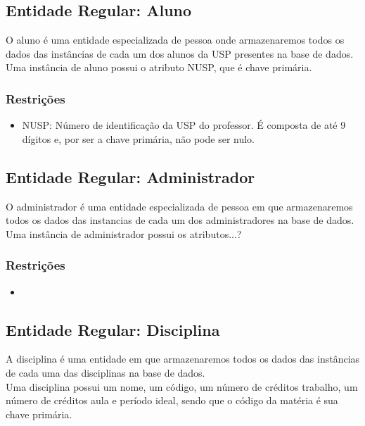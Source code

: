 \documentclass{article}
\begin{document}
  	\subsection{Entidade Regular: Aluno}
  	    \quad O aluno é uma entidade especializada de pessoa onde armazenaremos todos os dados das instâncias de cada um dos alunos da USP presentes na base de dados. \\
  	    \quad Uma instância de aluno possui o atributo NUSP, que é chave primária.
  	    \subsubsection{Restrições}
  	        \begin{itemize}
  		        \item NUSP: Número de identificação da USP do professor. É composta de até 9 dígitos e, por ser a chave primária, não pode ser nulo. 
  		    \end{itemize}
  		    
  	\subsection{Entidade Regular: Administrador}
  	    \quad O administrador é uma entidade especializada de pessoa em que armazenaremos todos os dados  das instancias de cada um dos administradores na base de dados. \\
  	    \quad Uma instância de administrador possui os atributos...?
  	    \subsubsection{Restrições}
  	        \begin{itemize}
  	            \item 
  	        \end{itemize}
  	        
  	\subsection{Entidade Regular: Disciplina}
  	    \quad A disciplina é uma entidade em que armazenaremos todos os dados das instâncias de cada uma das disciplinas na base de dados. \\
  	    \quad Uma disciplina possui um nome, um código, um número de créditos trabalho, um número de créditos aula e período ideal, sendo que o código da matéria é sua chave primária.
\end{document}
